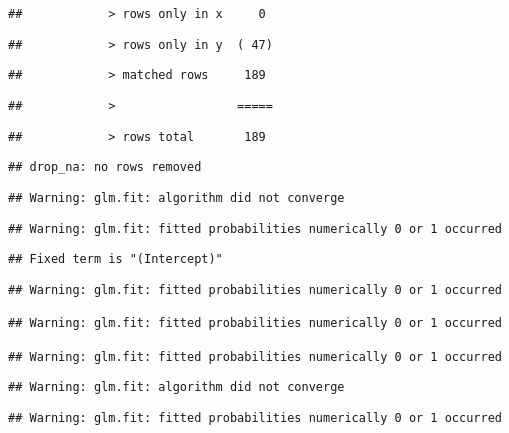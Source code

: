 \documentclass[
]{article}
\begin{document}
\begin{verbatim}
##            > rows only in x     0
\end{verbatim}

\begin{verbatim}
##            > rows only in y  ( 47)
\end{verbatim}

\begin{verbatim}
##            > matched rows     189
\end{verbatim}

\begin{verbatim}
##            >                 =====
\end{verbatim}

\begin{verbatim}
##            > rows total       189
\end{verbatim}

\begin{verbatim}
## drop_na: no rows removed
\end{verbatim}

\begin{verbatim}
## Warning: glm.fit: algorithm did not converge
\end{verbatim}

\begin{verbatim}
## Warning: glm.fit: fitted probabilities numerically 0 or 1 occurred
\end{verbatim}

\begin{verbatim}
## Fixed term is "(Intercept)"
\end{verbatim}

\begin{verbatim}
## Warning: glm.fit: fitted probabilities numerically 0 or 1 occurred

## Warning: glm.fit: fitted probabilities numerically 0 or 1 occurred

## Warning: glm.fit: fitted probabilities numerically 0 or 1 occurred
\end{verbatim}

\begin{verbatim}
## Warning: glm.fit: algorithm did not converge
\end{verbatim}

\begin{verbatim}
## Warning: glm.fit: fitted probabilities numerically 0 or 1 occurred
\end{verbatim}
\end{document}
